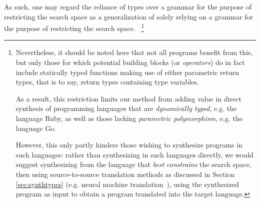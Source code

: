 \documentclass{article}
\begin{document}
As such, one may regard the reliance of types over a grammar for the purpose of restricting the search space as a generalization of solely relying on a grammar for the purpose of restricting the search space.%
~\footnote{
    Nevertheless, it should be noted here that not all programs benefit from this,
    but only those for which potential building blocks (or \emph{operators}) do in fact include statically typed functions making use of either parametric return types, that is to say, return types containing type variables.

    As a result, this restriction limits our method from adding value in direct synthesis of programming languages that are \emph{dynamically typed},
    e.g. the language Ruby, as well as those lacking \emph{parametric polymorphism}, e.g. the language Go.

    However, this only partly hinders those wishing to synthesize programs in such languages:
    rather than synthesizing in such languages directly, we would suggest synthesizing from the language that \emph{best constrains} the search space,
    then using source-to-source translation methods as discussed in Section
    \ref{sec:synthtypes}
    (e.g. neural machine translation~\citep{kalchbrenner2013recurrent}),
    using the synthesized program as input to obtain a program translated into the target language.
}




\end{document}
